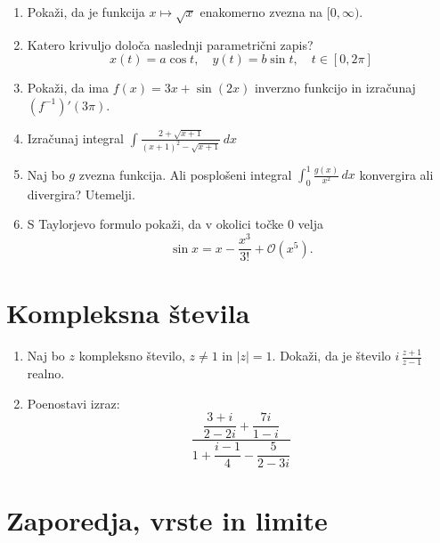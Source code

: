 \documentclass[a4paper,12pt]{article}
\begin{document}
\begin{enumerate}
\item
Pokaži, da je funkcija \(x \mapsto \sqrt{x}\) enakomerno zvezna na \([0,\infty).\)

\item
Katero krivuljo določa naslednji parametrični zapis?
\[
x(t) = a \cos t,\quad %
y(t) = b \sin t,\quad %
t \in [0, 2 \pi]
\]

\item
Pokaži, da ima \( f(x)=3x +\sin(2x)\) inverzno funkcijo in izračunaj \((f^{-1})'(3\pi)\).

\item
Izračunaj integral \(\displaystyle \int \frac{2+\sqrt{x+1}}{(x+1)^2-\sqrt{x+1}}\,dx\)

\item
Naj bo \(g\) zvezna funkcija. Ali posplošeni integral
\(\int_{0}^{1}\frac{g(x)}{x^2}\,dx\)
konvergira ali divergira? Utemelji.

\item
S Taylorjevo formulo pokaži, da v okolici točke \(0\) velja
\[\sin x = x-\frac{x^3}{3!}+\mathcal{O}(x^5).\]
\end{enumerate}

\section*{Kompleksna števila}

\begin{enumerate}
\item
Naj bo \(z\) kompleksno število, \(z \ne 1\) in \(|z|= 1\).
Dokaži, da je število \( i \, \frac{z+1}{z-1} \) realno.

\item
Poenostavi izraz:
\[\frac{\dfrac{3+ i}{2-2i}+\dfrac{7i}{1-i}}{1+ \dfrac{i-1}{4}-\dfrac{5}{2-3i}}\]
\end{enumerate}

\section*{Zaporedja, vrste in limite}
\end{document}

